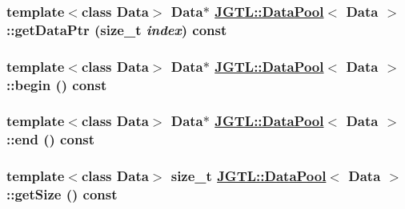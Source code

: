\hypertarget{class_j_g_t_l_1_1_data_pool_f4d1d2be96611b56b379ae8df2805f60}{
\subsubsection[getDataPtr]{\setlength{\rightskip}{0pt plus 5cm}template$<$class Data$>$ Data$\ast$ \hyperlink{class_j_g_t_l_1_1_data_pool}{JGTL::Data\-Pool}$<$ Data $>$::get\-Data\-Ptr (size\_\-t {\em index}) const}}
\label{class_j_g_t_l_1_1_data_pool_f4d1d2be96611b56b379ae8df2805f60}


\hypertarget{class_j_g_t_l_1_1_data_pool_a7705ab185a03a9637f7706a8e91b7d8}{
\subsubsection[begin]{\setlength{\rightskip}{0pt plus 5cm}template$<$class Data$>$ Data$\ast$ \hyperlink{class_j_g_t_l_1_1_data_pool}{JGTL::Data\-Pool}$<$ Data $>$::begin () const}}
\label{class_j_g_t_l_1_1_data_pool_a7705ab185a03a9637f7706a8e91b7d8}


\hypertarget{class_j_g_t_l_1_1_data_pool_4161e2ff9fe92083b6541ba6a007254b}{
\subsubsection[end]{\setlength{\rightskip}{0pt plus 5cm}template$<$class Data$>$ Data$\ast$ \hyperlink{class_j_g_t_l_1_1_data_pool}{JGTL::Data\-Pool}$<$ Data $>$::end () const}}
\label{class_j_g_t_l_1_1_data_pool_4161e2ff9fe92083b6541ba6a007254b}


\hypertarget{class_j_g_t_l_1_1_data_pool_2a36203564f65a695c1ed9cae869f379}{
\subsubsection[getSize]{\setlength{\rightskip}{0pt plus 5cm}template$<$class Data$>$ size\_\-t \hyperlink{class_j_g_t_l_1_1_data_pool}{JGTL::Data\-Pool}$<$ Data $>$::get\-Size () const}}
\label{class_j_g_t_l_1_1_data_pool_2a36203564f65a695c1ed9cae869f379}


